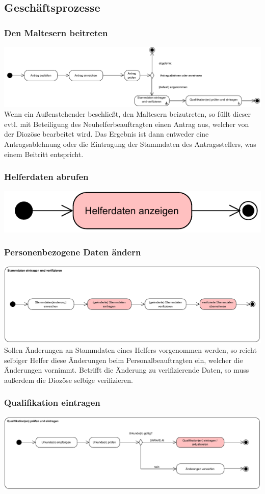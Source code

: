 \documentclass{beamer}
\begin{document}
\subsection{Geschäftsprozesse}		
\begin{frame}
\frametitle{Den Maltesern beitreten}
\includegraphics[width=\textwidth]{PDF/BusinessP/Mitglied_werden.pdf}
Wenn ein Außenstehender beschließt, den Maltesern beizutreten, so füllt dieser evtl. mit Beteiligung des Neuhelferbeauftragten einen Antrag aus, welcher von der Diozöse bearbeitet wird. Das Ergebnis ist dann entweder eine Antragsablehnung oder die Eintragung der Stammdaten des Antragsstellers, was einem Beitritt entspricht. 
\end{frame}
\begin{frame}
\frametitle{Helferdaten abrufen}
\includegraphics[width=\textwidth]{PDF/BusinessP/Daten_abrufen.pdf}
\end{frame}

\begin{frame}
\frametitle{Personenbezogene Daten ändern}
\includegraphics[width=\textwidth]{PDF/BusinessP/Daten_aendern.pdf}
Sollen Änderungen an Stammdaten eines Helfers vorgenommen werden, so reicht selbiger Helfer diese Änderungen beim Personalbeauftragten ein, welcher die Änderungen vornimmt. Betrifft die Änderung zu verifizierende Daten, so muss außerdem die Diozöse selbige verifizieren.
\end{frame}

\begin{frame}
\frametitle{Qualifikation eintragen}
\includegraphics[width=\textwidth]{PDF/BusinessP/Qualifikation_eintragen.pdf}
\end{frame}
\end{document}
